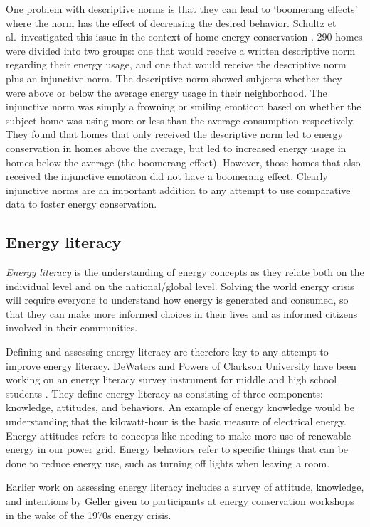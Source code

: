 One problem with descriptive norms is that they can lead to `boomerang effects' where the norm has the effect of decreasing the desired behavior. Schultz et al.\ investigated this issue in the context of home energy conservation \cite{Schultz2007SocialNorms}. 290 homes were divided into two groups: one that would receive a written descriptive norm regarding their energy usage, and one that would receive the descriptive norm plus an injunctive norm. The descriptive norm showed subjects whether they were above or below the average energy usage in their neighborhood. The injunctive norm was simply a frowning or smiling emoticon based on whether the subject home was using more or less than the average consumption respectively. They found that homes that only received the descriptive norm led to energy conservation in homes above the average, but led to increased energy usage in homes below the average (the boomerang effect). However, those homes that also received the injunctive emoticon did not have a boomerang effect. Clearly injunctive norms are an important addition to any attempt to use comparative data to foster energy conservation.

\subsection{Energy literacy}

\emph{Energy literacy} is the understanding of energy concepts as they relate both on the individual level and on the national/global level. Solving the world energy crisis will require everyone to understand how energy is generated and consumed, so that they can make more informed choices in their lives and as informed citizens involved in their communities.

Defining and assessing energy literacy are therefore key to any attempt to improve energy literacy. DeWaters and Powers of Clarkson University have been working on an energy literacy survey instrument for middle and high school students \cite{DeWaters09c, DeWaters09}. They define energy literacy as consisting of three components: knowledge, attitudes, and behaviors. An example of energy knowledge would be understanding that the kilowatt-hour is the basic measure of electrical energy. Energy attitudes refers to concepts like needing to make more use of renewable energy in our power grid. Energy behaviors refer to specific things that can be done to reduce energy use, such as turning off lights when leaving a room.

Earlier work on assessing energy literacy includes a survey of attitude, knowledge, and intentions by Geller \cite{Geller81} given to participants at energy conservation workshops in the wake of the 1970s energy crisis.

